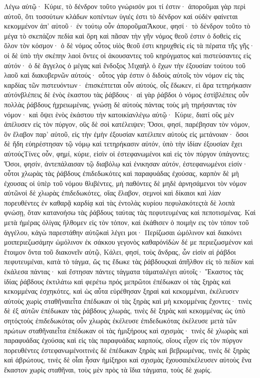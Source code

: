 Λέγω αὐτῷ· Κύριε, τὸ δένδρον τοῦτο γνώρισόν μοι τί ἐστιν· ἀποροῦμαι γὰρ περὶ αὐτοῦ, ὅτι τοσούτων κλάδων κοπέντων ὑγιές ἐστι τὸ δένδρον καὶ οὐδὲν φαίνεται κεκομμένον ἀπ’ αὐτοῦ· ἐν τούτῳ οὖν ἀποροῦμαιἌκουε, φησί· τὸ δένδρον τοῦτο τὸ μέγα τὸ σκεπάζον πεδία καὶ ὄρη καὶ πᾶσαν τὴν γῆν νόμος θεοῦ ἐστιν ὁ δοθεὶς εἰς ὅλον τὸν κόσμον· ὁ δὲ νόμος οὗτος υἱὸς θεοῦ ἐστι κηρυχθεὶς εἰς τὰ πέρατα τῆς γῆς· οἱ δὲ ὑπὸ τὴν σκέπην λαοὶ ὄντες οἱ ἀκουσαντες τοῦ κηρύγματος καὶ πιστεύσαντες εἰς αὐτόν· ὁ δὲ ἄγγελος ὁ μέγας καὶ ἔνδοξος Μιχαὴλ ὁ ἔχων τὴν ἐξουσίαν τούτου τοῦ λαοῦ καὶ διακυβερνῶν αὐτούς· οὗτος γάρ ἐστιν ὁ διδοὺς αὐτοῖς τὸν νόμον εἰς τὰς καρδίας τῶν πιστευόντων· ἐπισκέπτεται οὖν αὐτούς, οἷς ἔδωκεν, εἰ ἄρα τετηρήκασιν αὐτόνβλέπεις δὲ ἑνὸς ἑκαστου τὰς ῥάβδους· αἱ γὰρ ῥάβδοι ὁ νόμος ἐστίβλέπεις οὖν πολλὰς ῥάβδους ἠχρειωμένας, γνώσῃ δὲ αὐτοὺς πάντας τοὺς μὴ τηρήσαντας τὸν νόμον· καὶ ὄψει ἑνὸς ἑκάστου τὴν κατοικίανλέγω αὐτῷ· Κύριε, διατί οὓς μὲν ἀπέλυσεν εἰς τὸν πύργον, οὓς δὲ σοὶ κατέλειψεν; Ὅσοι, φησί, παρέβησαν τὸν νόμον, ὃν ἔλαβον παρ’ αὐτοῦ, εἰς τὴν ἐμὴν ἐξουσίαν κατέλιπεν αὐτοὺς εἰς μετάνοιαν· ὅσοι δὲ ἤδη εὐηρέστησαν τῷ νόμῳ καὶ τετηρήκασιν αὐτόν, ὑπὸ τὴν ἰδίαν ἐξουσίαν ἔχει αὐτούςΤίνες οὖν, φημί, κύριε, εἰσὶν οἱ ἐστεφανωμένοι καὶ εἰς τὸν πύργον ὑπάγοντες; Ὅσοι, φησίν, ἀντεπάλαισαν τῷ διαβόλῳ καὶ ἐνικησαν αὐτόν, ἐστεφανωμένοι εἰσίν· οὗτοι χλωρὰς τὰς ῥάβδους ἐπιδεδωκότες καὶ παραφυάδας ἐχούσας, καρπὸν δὲ μὴ ἐχουσας οἱ ὑπὲρ τοῦ νόμου θλιβέντες, μὴ παθόντες δὲ μηδὲ ἀρνησάμενοι τὸν νόμον αὐτῶνοἱ δὲ χλωρὰς ἐπιδεδωκότες, οἵας ἔλαβον, σεμνοὶ καὶ δίκαιοι καὶ λίαν πορευθέντες ἐν καθαρᾷ καρδίᾳ καὶ τὰς ἐντολὰς κυρίου πεφυλακότεςτὰ δὲ λοιπὰ φνώσῃ, ὅταν κατανοήσω τὰς ῥάβδους ταύτας τὰς πεφυτευμένας καὶ πεποτισμένας.
Καὶ μετὰ ἡμέρας ὀλίγας ἤλθομεν εἰς τὸν τόπον, καὶ ἐκάθισεν ὁ ποιμὴν εις τὸν τόπον τοῦ ἀγγέλου, κἀγὼ παρεστάθην αὐτῷκαὶ λέγει μοι· Περίζωσαι ὠμόλινον καὶ διακόνει μοιπεριεζωσάμην ὠμόλινον ἐκ σάκκου γεγονὸς καθαρόνἰδὼν δέ με περιεζωσμένον καὶ ἕτοιμον ὄντα τοῦ διακονεῖν αὐτῷ, Κάλει, φησί, τοὺς ἄνδρας, ὧν εἰσὶν αἱ ῥάβδοι πεφυτευμέναι, κατὰ τὸ τάγμα, ὥς τις ἔδωκε τὰς ῥάβδουςκαὶ ἀπῆλθον εἰς τὸ πεδίον καὶ ἐκάλεσα πάντας· καὶ ἔστησαν πάντες τάγματα τάματαλέγει αὐτοῖς· Ἕκαστος τὰς ἰδίας ῥάβδους ἐκτιλάτω καὶ φερέτω πρός μεπρῶτοι ἐπέδωκαν οἱ τὰς ξηρὰς καὶ κεκομμένας ἐσχηκότες, καὶ ὡς αὗτα εὑρέθησαν ξηραὶ καὶ κεκομμέναι, ἐκέλευσεν αὐτοὺς χωρὶς σταθῆναιεἶτα ἐπέδωκαν οἱ τὰς ξηρὰς καὶ μὴ κεκομμένας ἔχοντες· τινὲς δὲ ἐξ αὐτῶν ἐπέδωκαν τὰς ῥάβδους χλωράς, τινὲς δὲ ξηρὰς καὶ κεκομμένας ὡς ὑπὸ σητόςτοὺς ἐπιδεδωκότας οὖν χλωρὰς ἐκέλευσε ἐπιδεδωκότας ἐκέλευσε μετὰ τῶν πρώτων σταθῆναιεἶτα ἐπέδωκαν οἱ τὰς ἡμιξήρους καὶ σχισμὰς· τινὲς δὲ χλωρὰς καὶ παραφυάδας ἐχούσας καὶ εἰς τὰς παραφυάδας καρπούς, οἵους εἶχον εἰς τὸν πύργον πορευθέντες ἐστεφανωμένοιτινὲς δὲ ἐπέδωκαν ξηρὰς καὶ βεβρωμένας, τινὲς δὲ ξηρὰς καὶ ἀβρώτους, τινὲς δὲ οἷαι ἦσαν ἡμίξηροι καὶ σχισμὰς ἔχουσαιἐκέλευσεν αὐτοὺς ἕνα ἕκαστον χωρὶς σταθῆναι, τοὺς μὲν πρὸς τὰ ἴδια τάγματα, τοὺς δὲ χωρίς.
